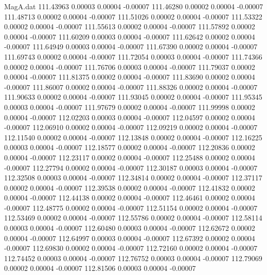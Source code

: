 \begin{filecontents}{MagA.dat}
 111.43963    0.00003    0.00004   -0.00007
 111.46280    0.00002    0.00004   -0.00007
 111.48713    0.00002    0.00004   -0.00007
 111.51026    0.00002    0.00004   -0.00007
 111.53322    0.00002    0.00004   -0.00007
 111.55613    0.00002    0.00004   -0.00007
 111.57892    0.00002    0.00004   -0.00007
 111.60209    0.00003    0.00004   -0.00007
 111.62642    0.00002    0.00004   -0.00007
 111.64949    0.00003    0.00004   -0.00007
 111.67390    0.00002    0.00004   -0.00007
 111.69743    0.00002    0.00004   -0.00007
 111.72054    0.00003    0.00004   -0.00007
 111.74366    0.00002    0.00004   -0.00007
 111.76706    0.00003    0.00004   -0.00007
 111.79037    0.00002    0.00004   -0.00007
 111.81375    0.00002    0.00004   -0.00007
 111.83690    0.00002    0.00004   -0.00007
 111.86007    0.00002    0.00004   -0.00007
 111.88326    0.00002    0.00004   -0.00007
 111.90633    0.00002    0.00004   -0.00007
 111.93045    0.00002    0.00004   -0.00007
 111.95345    0.00003    0.00004   -0.00007
 111.97679    0.00002    0.00004   -0.00007
 111.99998    0.00002    0.00004   -0.00007
 112.02203    0.00003    0.00004   -0.00007
 112.04597    0.00002    0.00004   -0.00007
 112.06910    0.00002    0.00004   -0.00007
 112.09219    0.00002    0.00004   -0.00007
 112.11540    0.00002    0.00004   -0.00007
 112.13848    0.00002    0.00004   -0.00007
 112.16225    0.00003    0.00004   -0.00007
 112.18577    0.00002    0.00004   -0.00007
 112.20836    0.00002    0.00004   -0.00007
 112.23117    0.00002    0.00004   -0.00007
 112.25488    0.00002    0.00004   -0.00007
 112.27794    0.00002    0.00004   -0.00007
 112.30187    0.00003    0.00004   -0.00007
 112.32508    0.00003    0.00004   -0.00007
 112.34814    0.00002    0.00004   -0.00007
 112.37117    0.00002    0.00004   -0.00007
 112.39538    0.00002    0.00004   -0.00007
 112.41832    0.00002    0.00004   -0.00007
 112.44138    0.00002    0.00004   -0.00007
 112.46461    0.00002    0.00004   -0.00007
 112.48775    0.00002    0.00004   -0.00007
 112.51154    0.00002    0.00004   -0.00007
 112.53469    0.00002    0.00004   -0.00007
 112.55786    0.00002    0.00004   -0.00007
 112.58114    0.00003    0.00004   -0.00007
 112.60480    0.00003    0.00004   -0.00007
 112.62672    0.00002    0.00004   -0.00007
 112.64997    0.00003    0.00004   -0.00007
 112.67392    0.00002    0.00004   -0.00007
 112.69830    0.00002    0.00004   -0.00007
 112.72160    0.00002    0.00004   -0.00007
 112.74452    0.00003    0.00004   -0.00007
 112.76752    0.00003    0.00004   -0.00007
 112.79069    0.00002    0.00004   -0.00007
 112.81506    0.00003    0.00004   -0.00007

\end{filecontents}
